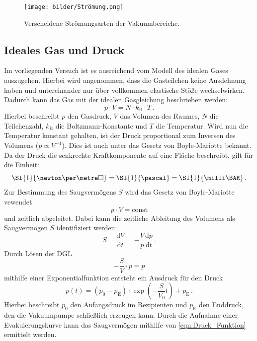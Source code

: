         \begin{figure}
            \centering
            \texttt{[image: bilder/Strömung.png]}
            \caption{Verscheidene Strömungsarten der Vakuumbereiche.\cite{Pfeiffer}}
            \label{fig:Strömung}
        \end{figure}

    \subsection{Ideales Gas und Druck}
        Im vorliegenden Versuch ist es ausreichend vom Modell des idealen Gases auszugehen.
        Hierbei wird angenommen, dass die Gasteilchen keine Ausdehnung haben und untereinander nur über vollkommen elastische Stöße wechselwirken.
        Dadurch kann das Gas mit der idealen Gasgleichung beschrieben werden:
        \begin{equation*}
            p \cdot V = N \cdot k_\text{B} \cdot T \, .
        \end{equation*}
        Hierbei beschreibt $p$ den Gasdruck, $V$ das Volumen des Raumes, $N$ die Teilchenzahl, $k_\text{B}$ die Boltzmann-Konstante und $T$ die Temperatur.
        Wird nun die Temperatur konstant gehalten, ist der Druck proportional zum Inversen des Volumens ($p \propto V^{-1}$).
        Dies ist auch unter das Gesetz von Boyle-Mariotte bekannt.
        \noindent
        Da der Druck die senkrechte Kraftkomponente auf eine Fläche beschreibt, gilt für die Einheit:
        \begin{equation*}
            \SI{1}{\newton\per\metre\square} = \SI{1}{\pascal} = \SI{1}{\milli\BAR} \, .
        \end{equation*}
        \noindent
        Zur Bestimmung des Saugvermögens $S$ wird das Gesetz von Boyle-Mariotte vewendet
        \begin{equation*}
            p \cdot V = \text{const}
        \end{equation*}
        und zeitlich abgeleitet.
        Dabei kann die zeitliche Ableitung des Volumens als Saugvermögen $S$ identifiziert werden:
        \begin{equation*}
            S = \frac{\text{d}V}{\text{d}t} = - \frac{V}{p} \frac{\text{d}p}{\text{d}t} \, .
        \end{equation*}
        Durch Lösen der DGL
        \begin{equation*}
            - \frac{S}{V} \cdot \dot{p} = p
        \end{equation*}
        mithilfe einer Exponentialfunktion entsteht ein Ausdruck für den Druck
        \begin{equation}
            p(t) = (p_0 - p_\text{E}) \cdot \exp{(- \frac{S}{V_0}t)} +p_\text{E} \, .
            \label{eqn:Druck_Funktion}
        \end{equation}
        Hierbei beschreibt $p_0$ den Anfangsdruck im Rezipienten und $p_\text{E}$ den Enddruck, den die Vakuumpumpe schließlich erzeugen kann.
        Durch die Aufnahme einer Evakuierungskurve kann das Saugvermögen mithilfe von \eqref{eqn:Druck_Funktion} ermittelt werden.

